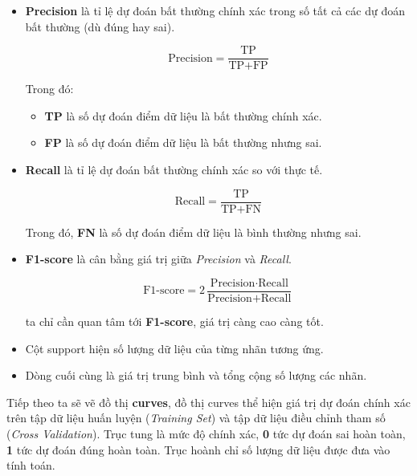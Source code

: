 \documentclass[../main-report.tex]{subfiles}
\begin{document}
\begin{itemize}
\item \textbf{Precision} là tỉ lệ dự đoán bất thường chính xác trong số tất cả các dự đoán bất thường (dù đúng hay sai).

\begin{displaymath}
\text{Precision} = \frac{\text{TP}}{\text{TP} + \text{FP}} 
\end{displaymath}

Trong đó:

\begin{itemize}
\item \textbf{TP} là số dự đoán điểm dữ liệu là bất thường chính xác.
\item \textbf{FP} là số dự đoán điểm dữ liệu là bất thường nhưng sai.
\end{itemize}

\item \textbf{Recall} là tỉ lệ dự đoán bất thường chính xác so với thực tế.

\begin{displaymath}
\text{Recall} = \frac{\text{TP}}{\text{TP} + \text{FN}}
\end{displaymath}

Trong đó, \textbf{FN} là số dự đoán điểm dữ liệu là bình thường nhưng sai.

\item \textbf{F1-score} là cân bằng giá trị giữa \emph{Precision} và \emph{Recall}. 

\begin{displaymath}
\text{F1-score} = 2\frac{\text{Precision}\cdot \text{Recall}}{\text{Precision} + \text{Recall}}
\end{displaymath}

ta chỉ cần quan tâm tới \textbf{F1-score}, giá trị càng cao càng tốt.
\item Cột support hiện số lượng dữ liệu của từng nhãn tương ứng.
\item Dòng cuối cùng là giá  trị trung bình và tổng cộng số lượng các nhãn.
\end{itemize}

Tiếp theo ta sẽ vẽ đồ thị \textbf{curves}, đồ thị curves thể hiện giá trị dự đoán chính xác trên tập dữ liệu huấn luyện (\emph{Training Set}) và tập dữ liệu điều chỉnh tham số (\emph{Cross Validation}). Trục tung là mức độ chính xác, \textbf{0} tức dự đoán sai hoàn toàn, \textbf{1} tức dự đoán đúng hoàn toàn. Trục hoành chỉ số lượng dữ liệu được đưa vào tính toán.
\end{document}
